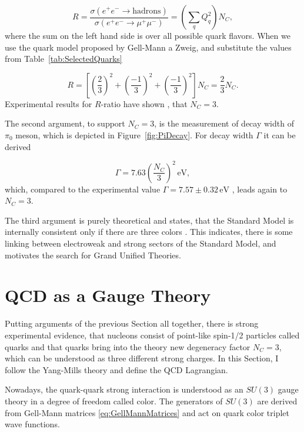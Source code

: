 \begin{equation}
  R = \frac{\sigma(e^+ e^- \rightarrow \text{hadrons})}{\sigma(e^+ e^-
  \rightarrow \mu^+ \mu^-)} = \left( \sum_q Q_q^2 \right) N_C,
  \label{eq:NumberOfColorsRatio}
\end{equation}
where the sum on the left hand side is over all possible quark flavors. When we
use the quark model proposed by Gell-Mann a Zweig, and substitute the values
from Table~\ref{tab:SelectedQuarks}

\begin{equation}
  R = \left[ \left( \frac{2}{3} \right)^2 +
    \left( \frac{-1}{3} \right)^2 +
  \left( \frac{-1}{3} \right)^2 \right] N_C = \frac{2}{3}N_C.
  \label{eq:NumberOfColorsSubstitued}
\end{equation}
Experimental results for $R$-ratio have shown \cite{PDG}, that $N_C = 3$.

The second argument, to support $N_C=3$, is the measurement of decay width of
$\pi_0$ meson, which is depicted in Figure~\ref{fig:PiDecay}. For decay width
$\Gamma$ it can be derived 

\begin{equation}
  \Gamma = 7.63 \left( \frac{N_C}{3} \right)^2 \, \text{eV},
  \label{ex:PiMesonDecayWidth}
\end{equation}
which, compared to the experimental value $\Gamma = 7.57 \pm 0.32 \, \text{eV}$
\cite{PDG}, leads again to $N_C=3$.

The third argument is purely theoretical and states, that the Standard Model is
internally consistent only if there are three colors \cite{QCDTextbook}. This
indicates, there is some linking between electroweak and strong sectors of
the Standard Model, and motivates the search for Grand Unified Theories.

\section{QCD as a Gauge Theory}

Putting arguments of the previous Section all together, there is strong
experimental evidence, that nucleons consist of point-like spin-1/2 particles
called quarks and that quarks bring into the theory new degeneracy factor $N_C =
3$, which can be understood as three different strong charges. In
this Section, I follow the Yang-Mills theory \cite{YangMill} and define the QCD
Lagrangian.

Nowadays, the quark-quark strong interaction is understood as an $SU(3)$ gauge theory in
a degree of freedom called color. The generators of $SU(3)$ are derived from
Gell-Mann matrices \eqref{eq:GellMannMatrices} and act on quark color triplet
wave functions.

